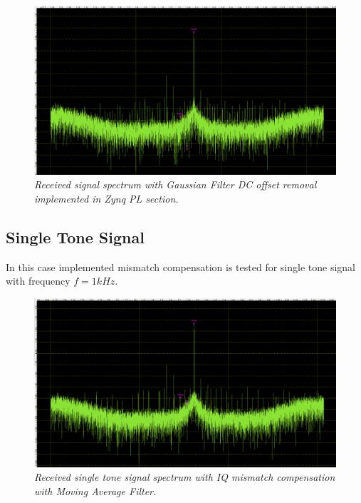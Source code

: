 \documentclass[en,printmode]{mgr}
\begin{document}
	 	\begin{figure}[H]
    		\centering
   			\includegraphics[width=\textwidth]{plots/my_dc_gauss.png}
   		 	\caption{\textit{Received signal spectrum with Gaussian Filter DC offset removal
   		 	implemented in Zynq PL section.}}
   		\end{figure}
   		
		\subsection*{Single Tone Signal}
		In this case implemented mismatch compensation is tested for
		single tone signal with frequency $f=1kHz$.
		\begin{figure}[!htb]
    		\centering
   			\includegraphics[width=\textwidth]{plots/my_single_mav.png}
   		 	\caption{\textit{Received single tone signal spectrum with IQ mismatch compensation with
   		 	Moving Average Filter.}}
   		\end{figure}
   		
\end{document}
